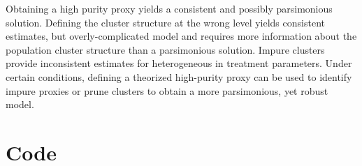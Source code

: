 \documentclass{jbsc}
\begin{document}
Obtaining a high purity proxy yields a consistent and possibly parsimonious solution. Defining the cluster structure at the wrong level yields consistent estimates, but overly-complicated model and requires more information about the population cluster structure than a parsimonious solution. Impure clusters provide inconsistent estimates for heterogeneous in treatment parameters. Under certain conditions, defining a theorized high-purity proxy can be used to identify impure proxies or prune clusters to obtain a more parsimonious, yet robust model.

\printbibliography

\appendix

\section{Code}
\end{document}
